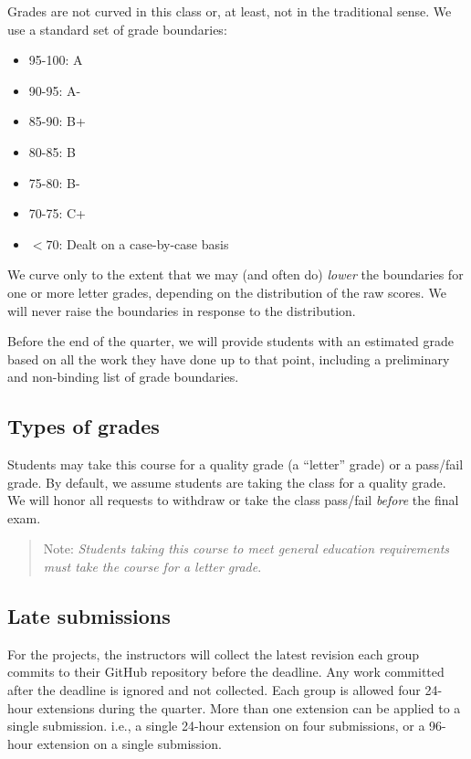 \documentclass[11pt]{article}
\begin{document}
Grades are not curved in this class or, at least, not in the traditional sense. We use a standard set of grade boundaries:
 
\begin{itemize}
 \item 95-100: A
 \item 90-95: A-
 \item 85-90: B+
 \item 80-85: B
 \item 75-80: B-
 \item 70-75: C+
 \item $<70$: Dealt on a case-by-case basis
\end{itemize}

We curve only to the extent that we may (and often do) \emph{lower} the boundaries for one or more letter grades, depending on the distribution of the raw scores.  We will never raise the boundaries in response to the distribution.

Before the end of the quarter, we will provide students with an estimated grade based on all the work they have done up to that point, including a preliminary and non-binding list of grade boundaries.

\subsection{Types of grades}

Students may take this course for a quality grade (a ``letter'' grade) or a pass/fail grade. By default, we assume students are taking the class for a quality grade. We will honor all requests to withdraw or take the class pass/fail \emph{before} the final exam.

\begin{quote}
Note: \emph{Students taking this course to meet general education requirements must take the course for a letter grade}. 
\end{quote}


\subsection{Late submissions}

For the projects, the instructors will collect the latest revision each group commits to their GitHub repository before the deadline. Any work committed after the deadline is ignored and not collected. Each group is allowed four 24-hour extensions during the quarter. More than one extension can be applied to a single submission. i.e., a single 24-hour extension on four submissions, or a 96-hour extension on a single submission.
\end{document}

